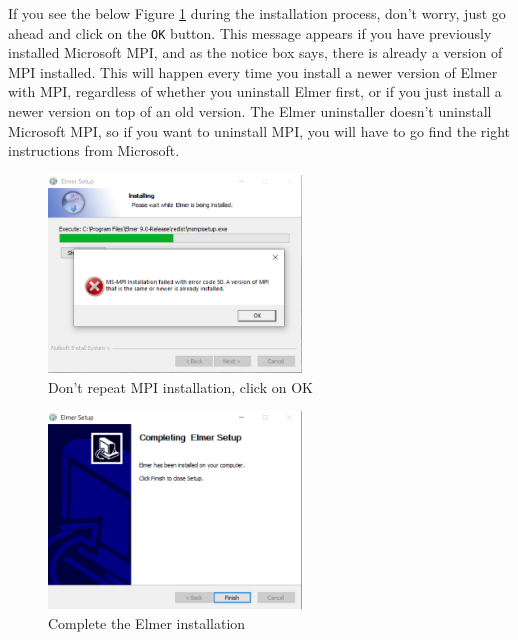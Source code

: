 \newpage

If you see the below Figure \ref{fg:installer-12} during the installation process, don't worry, just go ahead and click on the \texttt{OK} button.  This message appears if you have previously installed Microsoft MPI, and as the notice box says, there is already a version of MPI installed.  This will happen every time you install a newer version of Elmer with MPI, regardless of whether you uninstall Elmer first, or if you just install a newer version on top of an old version.  The Elmer uninstaller doesn't uninstall Microsoft MPI, so if you want to uninstall MPI, you will have to go find the right instructions from Microsoft.

\begin{figure}[H]
\begin{center}
\includegraphics[width=0.60\textwidth]{mpi-6}
\caption{Don't repeat MPI installation, click on OK}\label{fg:installer-12}
\end{center}
\end{figure}

\begin{figure}[H]
\begin{center}
\includegraphics[width=0.60\textwidth]{installer-10}
\caption{Complete the Elmer installation}\label{fg:installer-13}
\end{center}
\end{figure}

